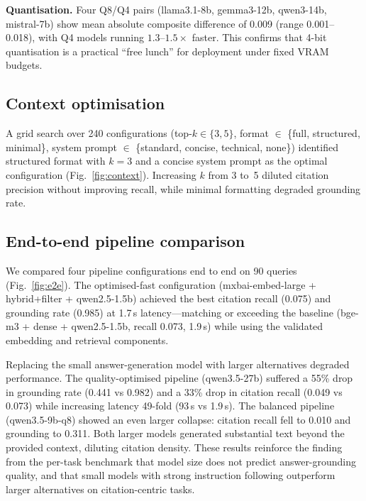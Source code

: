 \documentclass[sn-nature]{sn-jnl}
\begin{document}
\textbf{Quantisation.} Four Q8/Q4 pairs (llama3.1-8b, gemma3-12b,
qwen3-14b, mistral-7b) show mean absolute composite difference of 0.009
(range 0.001--0.018), with Q4 models running $1.3$--$1.5\times$ faster.
This confirms that 4-bit quantisation is a practical ``free lunch'' for
deployment under fixed VRAM budgets.

\subsection{Context optimisation}\label{sec:context-results}

A grid search over 240 configurations (top-$k \in \{3, 5\}$, format $\in$
\{full, structured, minimal\}, system prompt $\in$ \{standard, concise,
technical, none\}) identified structured format with $k = 3$ and a concise
system prompt as the optimal configuration (Fig.~\ref{fig:context}).
Increasing $k$ from 3 to~5 diluted citation precision without improving
recall, while minimal formatting degraded grounding rate.

\subsection{End-to-end pipeline comparison}\label{sec:e2e-results}

We compared four pipeline configurations end to end on 90 queries
(Fig.~\ref{fig:e2e}). The optimised-fast configuration (mxbai-embed-large +
hybrid+filter + qwen2.5-1.5b) achieved the best citation recall (0.075) and
grounding rate (0.985) at 1.7\,s latency---matching or exceeding the
baseline (bge-m3 + dense + qwen2.5-1.5b, recall 0.073, 1.9\,s) while using
the validated embedding and retrieval components.

Replacing the small answer-generation model with larger alternatives
degraded performance. The quality-optimised pipeline (qwen3.5-27b) suffered
a 55\% drop in grounding rate (0.441 vs 0.982) and a 33\% drop in citation
recall (0.049 vs 0.073) while increasing latency 49-fold (93\,s vs 1.9\,s).
The balanced pipeline (qwen3.5-9b-q8) showed an even larger collapse:
citation recall fell to 0.010 and grounding to 0.311. Both larger models
generated substantial text beyond the provided context, diluting citation
density. These results reinforce the finding from the per-task benchmark
that model size does not predict answer-grounding quality, and that small
models with strong instruction following outperform larger alternatives
on citation-centric tasks.
\end{document}
